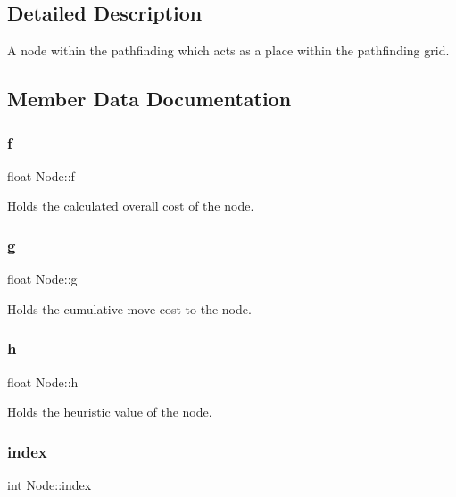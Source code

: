 \subsection{Detailed Description}
A node within the pathfinding which acts as a place within the pathfinding grid. 

\subsection{Member Data Documentation}
\mbox{\label{struct_node_ad16e9a3090431644ea3283b07c91a6a4}} 
\subsubsection{\texorpdfstring{f}{f}}
{\footnotesize\ttfamily float Node\+::f}



Holds the calculated overall cost of the node. 

\mbox{\label{struct_node_a914881afe2945fb2e60eb68a6c223d30}} 
\subsubsection{\texorpdfstring{g}{g}}
{\footnotesize\ttfamily float Node\+::g}



Holds the cumulative move cost to the node. 

\mbox{\label{struct_node_ab7d8a0250a536b3b221dd6d42e7630e0}} 
\subsubsection{\texorpdfstring{h}{h}}
{\footnotesize\ttfamily float Node\+::h}



Holds the heuristic value of the node. 

\mbox{\label{struct_node_ac8055cdbda20cacce417192557741ab8}} 
\subsubsection{\texorpdfstring{index}{index}}
{\footnotesize\ttfamily int Node\+::index}



